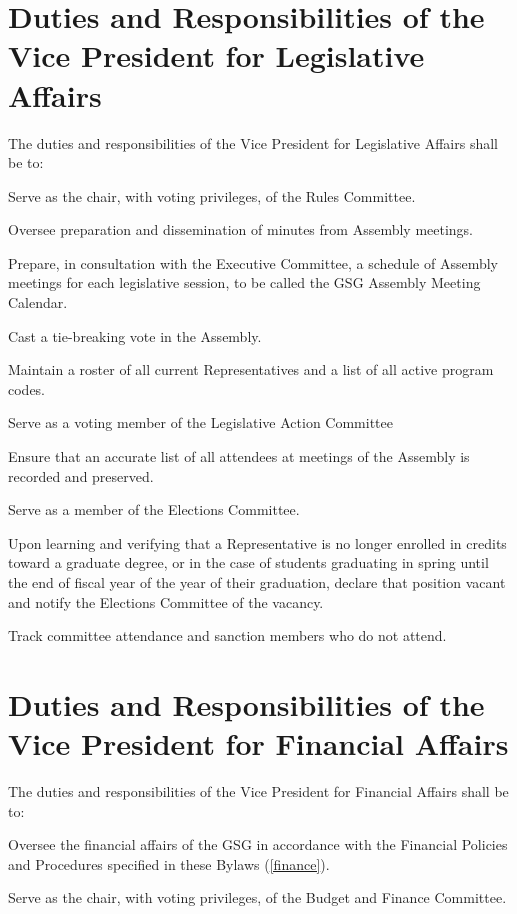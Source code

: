 \section{Duties and Responsibilities of the Vice President for Legislative Affairs}
The duties and responsibilities of the Vice President for Legislative Affairs shall be to:
\begin{bylaws-number}
  \item Serve as the chair, with voting privileges, of the Rules Committee.
  \item Oversee preparation and dissemination of minutes from Assembly meetings.
  \item Prepare, in consultation with the Executive Committee, a schedule of Assembly meetings for each legislative session, to be called the GSG Assembly Meeting Calendar.
  \item Cast a tie-breaking vote in the Assembly.
  \item Maintain a roster of all current Representatives and a list of all active program codes.
  \item Serve as a voting member of the Legislative Action Committee
  \item Ensure that an accurate list of all attendees at meetings of the Assembly is recorded and preserved.
  \item Serve as a member of the Elections Committee.
  \item Upon learning and verifying that a Representative is no longer enrolled in credits toward a graduate degree, or in the case of students graduating in spring until the end of fiscal year of the year of their graduation, declare that position vacant and notify the Elections Committee of the vacancy.
  \item Track committee attendance and sanction members who do not attend.
\end{bylaws-number}

\section{Duties and Responsibilities of the Vice President for Financial Affairs}
The duties and responsibilities of the Vice President for Financial Affairs shall be to:
\begin{bylaws-number}
  \item Oversee the financial affairs of the GSG in accordance with the Financial Policies and Procedures specified in these Bylaws (\chaptername \ref{finance}).
  \item Serve as the chair, with voting privileges, of the Budget and Finance Committee.
\end{bylaws-number}

